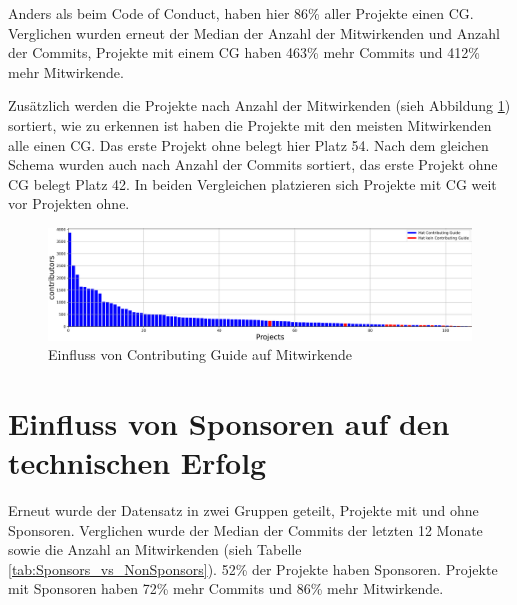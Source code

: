 Anders als beim Code of Conduct, haben hier 86\% aller Projekte einen CG. Verglichen wurden erneut
der Median der Anzahl der Mitwirkenden und Anzahl der Commits, Projekte mit einem CG haben 463\% mehr
Commits und 412\% mehr Mitwirkende.

Zusätzlich werden die Projekte nach Anzahl der Mitwirkenden (sieh Abbildung \ref{abb:ContributingGuide_vs_Contributors})
sortiert, wie zu erkennen ist haben die Projekte mit den meisten Mitwirkenden alle einen CG. Das
erste Projekt ohne belegt hier Platz 54. Nach dem gleichen Schema wurden auch nach Anzahl der Commits
sortiert, das erste Projekt ohne CG belegt Platz 42.
In beiden Vergleichen platzieren sich Projekte mit CG weit vor Projekten ohne.

\begin{figure}[h]
    \centering
    \includegraphics[scale=0.42]{figures/05/Contributors_Projects_asBarChart.png}
    \caption{Einfluss von Contributing Guide auf Mitwirkende}
    \label{abb:ContributingGuide_vs_Contributors}
\end{figure}






\section{Einfluss von Sponsoren auf den technischen Erfolg}\label{sec:sponsoren_datenerhebung}


Erneut wurde der Datensatz in zwei Gruppen geteilt, Projekte mit und ohne Sponsoren. Verglichen wurde
der Median der Commits der letzten 12 Monate sowie die Anzahl an Mitwirkenden 
(sieh Tabelle \ref{tab:Sponsors_vs_NonSponsors}).
52\% der Projekte haben Sponsoren. Projekte mit Sponsoren haben 72\% mehr Commits und 86\% mehr Mitwirkende.


